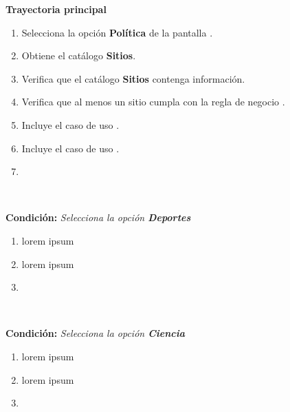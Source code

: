 

\begin{large}
	\textbf{Trayectoria principal}\\
\end{large}	

\begin{enumerate}[1.]
	\item \actor Selecciona la opción \textbf{Política} de la pantalla .   
	\item \sistema Obtiene el catálogo \textbf{Sitios}.
	\item \sistema Verifica que el catálogo \textbf{Sitios} contenga información. 
	\item \sistema Verifica que al menos un sitio cumpla con la regla de negocio . 
	\item \sistema Incluye el caso de uso .
	\item \sistema Incluye el caso de uso .
	\item \finCU	
\end{enumerate}



\begin{large}
	\\
\end{large}	
\textbf{Condición:} \textit{Selecciona la opción \textbf{Deportes}}
\begin{enumerate}[{A-}1.]
	\item \actor lorem ipsum
	\item \sistema lorem ipsum
	\item \finTA	

\end{enumerate}


\begin{large}
	\\
\end{large}	
\textbf{Condición:} \textit{Selecciona la opción \textbf{Ciencia}}

\begin{enumerate}[{B-}1.]

	\item \actor lorem ipsum
	\item \sistema lorem ipsum
	\item \finTA	

\end{enumerate}


